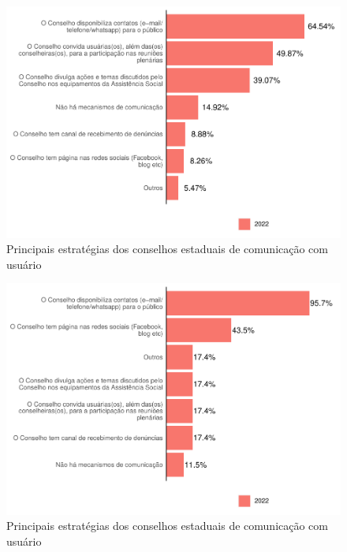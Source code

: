 \documentclass[
  brazilian]{report}
\begin{document}
\begin{figure}
\includegraphics{Censo-SUAS-2022_files/figure-latex/cmun_usu-1} \caption[Principais estratégias dos conselhos estaduais de comunicação com usuário]{Principais estratégias dos conselhos estaduais de comunicação com usuário}\label{fig:cmun_usu}
\end{figure}

\begin{figure}
\includegraphics{Censo-SUAS-2022_files/figure-latex/ceas_usu-1} \caption[Principais estratégias dos conselhos estaduais de comunicação com usuário]{Principais estratégias dos conselhos estaduais de comunicação com usuário}\label{fig:ceas_usu}
\end{figure}
\end{document}

